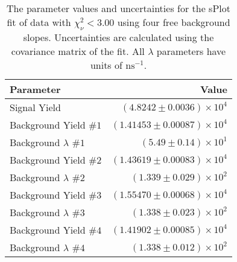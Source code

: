 
\begin{table}[h]
    \begin{center}
        \begin{tabular}{lr}\toprule
            Parameter & Value \\\midrule
            Signal Yield & $(4.8242 \pm 0.0036) \times 10^{4}$ \\
            Background Yield $\#1$ & $(1.41453 \pm 0.00087) \times 10^{4}$ \\
            Background $\lambda$ $\#1$ & $(5.49 \pm 0.14) \times 10^{1}$ \\
            Background Yield $\#2$ & $(1.43619 \pm 0.00083) \times 10^{4}$ \\
            Background $\lambda$ $\#2$ & $(1.339 \pm 0.029) \times 10^{2}$ \\
            Background Yield $\#3$ & $(1.55470 \pm 0.00068) \times 10^{4}$ \\
            Background $\lambda$ $\#3$ & $(1.338 \pm 0.023) \times 10^{2}$ \\
            Background Yield $\#4$ & $(1.41902 \pm 0.00085) \times 10^{4}$ \\
            Background $\lambda$ $\#4$ & $(1.338 \pm 0.012) \times 10^{2}$ \\\bottomrule
        \end{tabular}
        \caption{The parameter values and uncertainties for the sPlot fit of data with $\chi^2_\nu < 3.00$ using four free background slopes. Uncertainties are calculated using the covariance matrix of the fit. All $\lambda$ parameters have units of $\si{\nano\second}^{-1}$.}
    \end{center}
\end{table}
